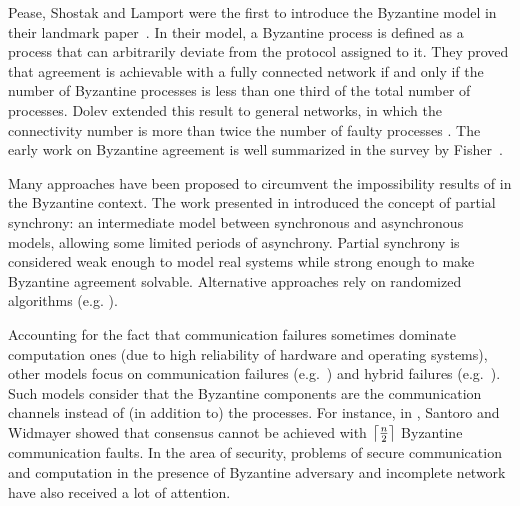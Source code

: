 \documentclass[11pt,letterpaper]{article}
\DeclarePairedDelimiter\ceil{\lceil}{\rceil}
\begin{document}
Pease, Shostak and Lamport were the first to introduce
the Byzantine model in their landmark
paper~\cite{lamport1982byzantine,pease1980reaching}.
In their model, a Byzantine process is defined as a process that can
arbitrarily deviate from the protocol assigned to it.
They proved that  agreement is achievable
with a fully connected network if and only if the number of Byzantine
processes is less than one third of the total number of
processes. Dolev extended this
result to general networks, in which the connectivity number is more than twice
the number of faulty processes \cite{dolev1982byzantine}.
The early work on Byzantine agreement
is well summarized in the survey by Fisher~{\cite{fischer1983consensus}}.

Many approaches have been proposed to circumvent the impossibility results of
\cite{fischer1985impossibility} in the Byzantine context.
The work presented in \cite{dwork1988consensus} introduced the concept
of partial synchrony: an intermediate model between
synchronous and asynchronous models, allowing some
limited periods of asynchrony. Partial synchrony is considered weak enough to model  real systems
while  strong enough to make Byzantine agreement solvable.
Alternative approaches rely on randomized algorithms (e.g.
{\cite{braud2013fast,dwork1988fault,king2011load,rabin1983randomized}}).

Accounting for the fact that communication failures sometimes dominate
computation ones (due to high reliability of hardware and operating systems), other models
focus on communication failures (e.g.~{\cite{perry1986distributed,schmid2002formally}}) and hybrid failures
(e.g.~{\cite{gong1998byzantine,lincoln1993formally}}). Such models
consider that the Byzantine components are the communication channels instead of 
(in addition to) the processes.
For instance, in \cite{santoro1989time,santoro2007agreement}, Santoro and Widmayer
showed that consensus cannot be achieved with $\ceil*{\frac{n}{2}}$
Byzantine communication faults. 
In the area of security, problems of secure communication and computation in the presence of Byzantine adversary and incomplete network \cite{dolev1982byzantine,franklin1998secure} have also received a lot of attention.
%
\end{document}
